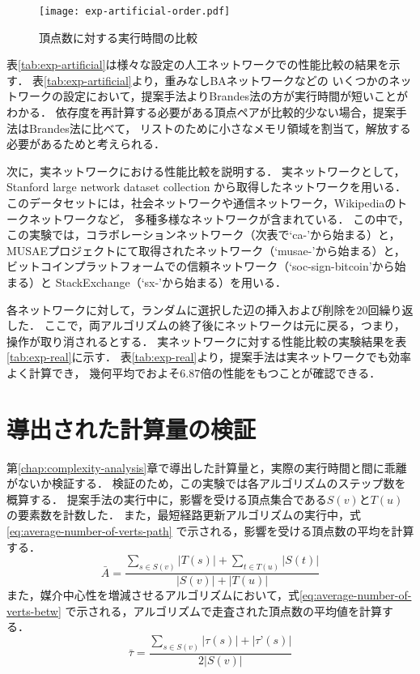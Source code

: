 \begin{figure}[tb]
  \centering
  \texttt{[image: exp-artificial-order.pdf]}
  \caption{頂点数に対する実行時間の比較}
  \label{fig:exp-artificial-order}
\end{figure}

表\ref{tab:exp-artificial}は様々な設定の人工ネットワークでの性能比較の結果を示す．
表\ref{tab:exp-artificial}より，重みなしBAネットワークなどの
いくつかのネットワークの設定において，提案手法よりBrandes法の方が実行時間が短いことがわかる．
依存度を再計算する必要がある頂点ペアが比較的少ない場合，提案手法はBrandes法に比べて，
リストのために小さなメモリ領域を割当て，解放する必要があるためと考えられる．



次に，実ネットワークにおける性能比較を説明する．
実ネットワークとして，Stanford large network dataset collection\cite{Leskovec2016}
から取得したネットワークを用いる．
このデータセットには，社会ネットワークや通信ネットワーク，Wikipediaのトークネットワークなど，
多種多様なネットワークが含まれている．
この中で，この実験では，コラボレーションネットワーク（次表で`ca-'から始まる）と，
MUSAEプロジェクト\cite{Rozemberczki2019b}にて取得されたネットワーク（`musae-'から始まる）と，
ビットコインプラットフォームでの信頼ネットワーク（`soc-sign-bitcoin'から始まる）と
StackExchange（`sx-'から始まる）を用いる．

各ネットワークに対して，ランダムに選択した辺の挿入および削除を$20$回繰り返した．
ここで，両アルゴリズムの終了後にネットワークは元に戻る，つまり，操作が取り消されるとする．
実ネットワークに対する性能比較の実験結果を表\ref{tab:exp-real}に示す．
表\ref{tab:exp-real}より，提案手法は実ネットワークでも効率よく計算でき，
幾何平均でおよそ$6.87$倍の性能をもつことが確認できる．



\section{導出された計算量の検証}

第\ref{chap:complexity-analysis}章で導出した計算量と，実際の実行時間と間に乖離がないか検証する．
検証のため，この実験では各アルゴリズムのステップ数を概算する．
提案手法の実行中に，影響を受ける頂点集合である$S(v)$と$T(u)$の要素数を計数した．
また，最短経路更新アルゴリズムの実行中，式\eqref{eq:average-number-of-verts-path}
で示される，影響を受ける頂点数の平均を計算する．
\begin{equation}
  \bar{A}=\frac{\sum_{s\in S(v)}|T(s)|+\sum_{t\in T(u)}|S(t)|}{|S(v)|+|T(u)|}
  \label{eq:average-number-of-verts-path}
\end{equation}
また，媒介中心性を増減させるアルゴリズムにおいて，式\eqref{eq:average-number-of-verts-betw}
で示される，アルゴリズムで走査された頂点数の平均値を計算する．
\begin{equation}
  \bar{\tau}=\frac{\sum_{s\in S(v)}|\tau(s)|+|\tau’(s)|}{2|S(v)|}
  \label{eq:average-number-of-verts-betw}
\end{equation}

